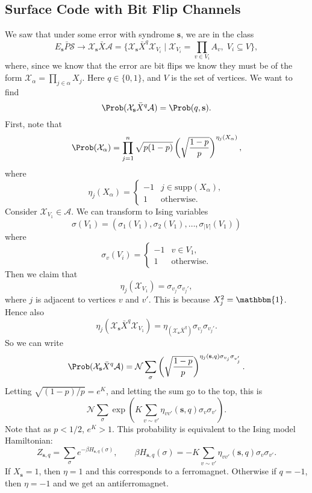\documentclass[12pt]{article}
\begin{document}
\subsection{Surface Code with Bit Flip Channels}%
\label{sub:scbf}

We saw that under some error with syndrome $\mathbf{s}$, we are in the class
\[
	E_{\mathbf{s}} \bar P \mathcal{S} \to \mathcal{X}_{\mathbf{s}} \bar X \mathcal{A} = \{ \mathcal{X}_{\mathbf{s}} \bar X^q \mathcal{X}_{V_i} \mid \mathcal{X}_{V_i} = \prod_{v \in V_i} A_v, \; V_i \subseteq V\},
\]
where, since we know that the error are bit flips we know they must be of the form $\mathcal{X}_\alpha = \prod_{j \in \alpha} X_j$. Here $q \in \{0, 1\}$, and $V$ is the set of vertices. We want to find
\[
\Prob(\mathcal{X}_{\mathbf{s}} \bar X^q \mathcal{A}) = \Prob(q, \mathbf{s}).
\]
First, note that
\[
	\Prob(\mathcal{X}_{\alpha}) = \prod_{j = 1}^{n} \sqrt{p (1 - p)} \left(\sqrt{\frac{1-p}{p}}\right)^{\eta_j(X_\alpha)},
\]
where
\[
\eta_j(X_\alpha) =
\begin{cases}
	-1 & j \in \mathrm{supp}(X_\alpha), \\
	1 & \text{otherwise}.
\end{cases}
\]
Consider $\mathcal{X}_{V_1} \in \mathcal{A}$. We can transform to Ising variables
\[
\sigma(V_1) = (\sigma_1(V_1), \sigma_2(V_1), \ldots, \sigma_{|V|}(V_1))
\]
where
\[
\sigma_v(V_i) =
\begin{cases}
	-1 & v \in V_1, \\
	1 & \text{otherwise}.
\end{cases}
\]
Then we claim that
\[
\eta_j(\mathcal{X}_{V_1}) = \sigma_{v_j} \sigma_{v_j'},
\]
where $j$ is adjacent to vertices $v$ and $v'$. This is because $X_j^2 = \mathbbm{1}$. Hence also
\[
\eta_j(\mathcal{X}_{\mathbf{s}} \bar X^q \mathcal{X}_{V_1}) = \eta_(\mathcal{X}_{\mathbf{s}} \bar X^q) \sigma_{v_j} \sigma_{v_j'}.
\]
So we can write
\[
	\Prob(\mathcal{X}_{\mathbf{s}} \bar X^q \mathcal{A}) = \mathcal{N} \sum_{\sigma} \left( \sqrt{\frac{1-p}{p}} \right)^{\eta_j(\mathbf{s}, q) \sigma_{v_j} \sigma_{v_j'}}.
\]
Letting $\sqrt{(1-p)/p} = e^{K}$, and letting the sum go to the top, this is
\[
\mathcal{N} \sum_{\sigma} \exp \left( K \sum_{v \sim v'} \eta_{v v'}(\mathbf{s}, q) \sigma_v \sigma_{v'} \right).
\]
Note that as $p < 1/2$, $e^{K} > 1$. This probability is equivalent to the Ising model Hamiltonian:
\[
Z_{\mathbf{s}, q} = \sum_{\sigma} e^{- \beta H_{\mathbf{s}, q}(\sigma)}, \qquad \beta H_{\mathbf{s}, q}(\sigma) = -K \sum_{v \sim v'} \eta_{vv'} (\mathbf{s}, q) \sigma_v \sigma_{v'}.
\]
If $X_{\mathbf{s}} = 1$, then $\eta = 1$ and this corresponds to a ferromagnet. Otherwise if $q = -1$, then $\eta = -1$ and we get an antiferromagnet.


\newpage

\printindex
\end{document}

